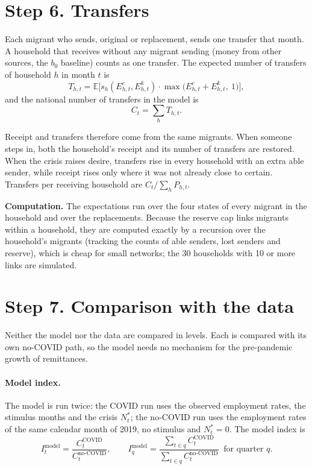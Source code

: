 \documentclass[11pt]{article}
\begin{document}
\section*{Step 6. Transfers}

Each migrant who sends, original or replacement, sends one transfer that month. A household that receives without any migrant sending (money from other sources, the $b_0$ baseline) counts as one transfer. The expected number of transfers of household $h$ in month $t$ is
\begin{equation}
T_{h,t} = \mathbb{E}\Big[s_h(E^c_{h,t}, E^k_{h,t}) \cdot \max\big(E^c_{h,t} + E^k_{h,t},\ 1\big)\Big],
\end{equation}
and the national number of transfers in the model is
\begin{equation}
C_t = \sum_h T_{h,t}.
\end{equation}

Receipt and transfers therefore come from the same migrants. When someone steps in, both the household's receipt and its number of transfers are restored. When the crisis raises desire, transfers rise in every household with an extra able sender, while receipt rises only where it was not already close to certain. Transfers per receiving household are $C_t / \sum_h P_{h,t}$.

\textbf{Computation.} The expectations run over the four states of every migrant in the household and over the replacements. Because the reserve cap links migrants within a household, they are computed exactly by a recursion over the household's migrants (tracking the counts of able senders, lost senders and reserve), which is cheap for small networks; the 30 households with 10 or more links are simulated.

\section*{Step 7. Comparison with the data}

Neither the model nor the data are compared in levels. Each is compared with its own no-COVID path, so the model needs no mechanism for the pre-pandemic growth of remittances.

\paragraph{Model index.} The model is run twice: the COVID run uses the observed employment rates, the stimulus months and the crisis $N^*_t$; the no-COVID run uses the employment rates of the same calendar month of 2019, no stimulus and $N^*_t = 0$. The model index is
\begin{equation}
I^{\text{model}}_t = \frac{C^{\text{COVID}}_t}{C^{\text{no-COVID}}_t}, \qquad
I^{\text{model}}_q = \frac{\sum_{t \in q} C^{\text{COVID}}_t}{\sum_{t \in q} C^{\text{no-COVID}}_t}\ \text{ for quarter } q.
\end{equation}
\end{document}
